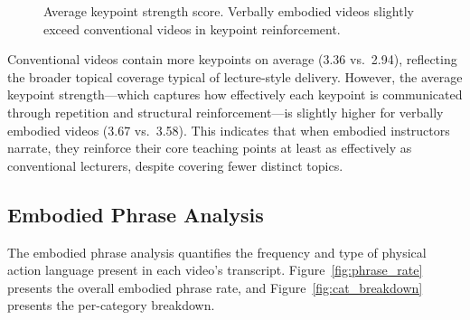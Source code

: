 \documentclass[fleqn,10pt]{JLA_article} %
\begin{document}
\begin{figure}[h!]
    \centering
    \caption{Average keypoint strength score. Verbally embodied videos slightly exceed conventional videos in keypoint reinforcement.}
    \label{fig:kp_strength}
\end{figure}

Conventional videos contain more keypoints on average (3.36 vs.\ 2.94), reflecting the broader topical coverage typical of lecture-style delivery. However, the average keypoint strength---which captures how effectively each keypoint is communicated through repetition and structural reinforcement---is slightly higher for verbally embodied videos (3.67 vs.\ 3.58). This indicates that when embodied instructors narrate, they reinforce their core teaching points at least as effectively as conventional lecturers, despite covering fewer distinct topics.

\subsection{Embodied Phrase Analysis}

The embodied phrase analysis quantifies the frequency and type of physical action language present in each video's transcript. Figure~\ref{fig:phrase_rate} presents the overall embodied phrase rate, and Figure~\ref{fig:cat_breakdown} presents the per-category breakdown.
\end{document}

